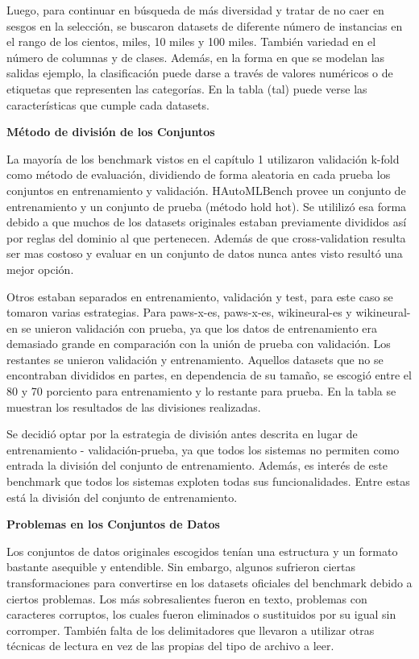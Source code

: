 Luego, para continuar en búsqueda de más diversidad y tratar de no caer en sesgos en la selección, se buscaron datasets de diferente número de instancias en el rango 
de los cientos, miles, 10 miles y 100 miles. También variedad en el número de columnas y de clases. Además, en la forma en que se modelan las salidas ejemplo, la 
clasificación puede darse a través de valores numéricos o de etiquetas que representen las categorías. En la tabla (tal) puede verse las características que cumple 
cada datasets.
\begin{flushleft} 
    {\large { \textbf{Método de división de los Conjuntos}}}\label{section:division}
\end{flushleft}
La mayoría de los benchmark vistos en el capítulo 1 utilizaron validación k-fold como método de evaluación, dividiendo de forma 
aleatoria en cada prueba los conjuntos en entrenamiento y validación. HAutoMLBench provee un conjunto de entrenamiento y un conjunto de prueba (método hold hot). 
Se utililizó esa forma debido a que muchos de los datasets originales estaban previamente divididos así por reglas del dominio al que pertenecen. 
Además de que cross-validation resulta ser mas costoso y evaluar en un conjunto de datos nunca antes visto resultó una mejor opción.  

Otros estaban separados en entrenamiento, validación y test, para este caso se 
tomaron varias estrategias. Para paws-x-es, paws-x-es, wikineural-es y wikineural-en se unieron validación con prueba, ya que los datos de entrenamiento era 
demasiado grande en comparación con la unión de prueba con validación. Los restantes se unieron validación y entrenamiento. Aquellos datasets que no se encontraban 
divididos en partes, en dependencia de su tamaño, se escogió entre el 80 y 70 porciento para entrenamiento y lo restante para prueba. En la tabla se muestran 
los resultados de las divisiones realizadas. 

Se decidió optar por la estrategia de división antes descrita en lugar de entrenamiento - validación-prueba, ya que 
todos los sistemas no permiten como entrada la división del conjunto de entrenamiento. Además, es interés de este benchmark que todos los sistemas exploten todas sus 
funcionalidades. Entre estas está la división del conjunto de entrenamiento.

\begin{flushleft} 
    {\large { \textbf{Problemas en los Conjuntos de Datos}}}\label{section:dataproblems}
\end{flushleft}
Los conjuntos de datos originales escogidos tenían una estructura y un formato bastante asequible y entendible. Sin embargo, algunos sufrieron ciertas transformaciones 
para convertirse en los datasets oficiales del benchmark debido a ciertos problemas. Los más sobresalientes fueron en texto, 
problemas con caracteres corruptos, los cuales fueron eliminados o sustituidos por su igual sin corromper. También falta de los delimitadores que llevaron a utilizar 
otras técnicas de lectura en vez de las propias del tipo de archivo a leer.


